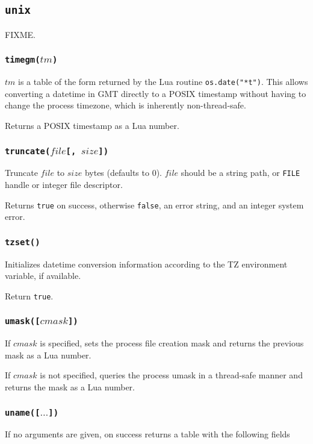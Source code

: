 \documentclass[11pt, oneside]{memoir}
\newcommand*{\true}[0]{\texttt{true}\xspace}
\newcommand*{\false}[0]{\texttt{false}\xspace}
\newcommand*{\fn}[1]{\texttt{#1}\xspace}
\newcommand*{\const}[1]{\texttt{#1}\xspace}
\newcounter{toccols}
\newenvironment{Module}[1]{
	\subsection{\texttt{#1}}
	\addtocontents{toc}{
		\protect\begin{multicols}{\value{toccols}}
	}
}{
	\addtocontents{toc}{\protect\end{multicols}}
}
\begin{document}
\begin{Module}{unix}
FIXME.

\subsubsection[\fn{timegm}]{\fn{timegm($tm$)}}

$tm$ is a table of the form returned by the Lua routine \fn{os.date("*t")}. This allows converting a datetime in GMT directly to a POSIX timestamp without having to change the process timezone, which is inherently non-thread-safe.

Returns a POSIX timestamp as a Lua number.

\subsubsection[\fn{truncate}]{\fn{truncate($file$[, $size$])}}

Truncate $file$ to $size$ bytes (defaults to 0). $file$ should be a string path, or \const{FILE} handle or integer file descriptor.

Returns \true on success, otherwise \false, an error string, and an integer system error. 

\subsubsection[\fn{tzset}]{\fn{tzset()}}

Initializes datetime conversion information according to the TZ environment variable, if available.

Return \true.

\subsubsection[\fn{umask}]{\fn{umask([$cmask$])}}

If $cmask$ is specified, sets the process file creation mask and returns the previous mask as a Lua number.

If $cmask$ is not specified, queries the process umask in a thread-safe manner and returns the mask as a Lua number.

\subsubsection[\fn{uname}]{\fn{uname([$\ldots$])}}

If no arguments are given, on success returns a table with the following fields


\end{Module}
\end{document}
